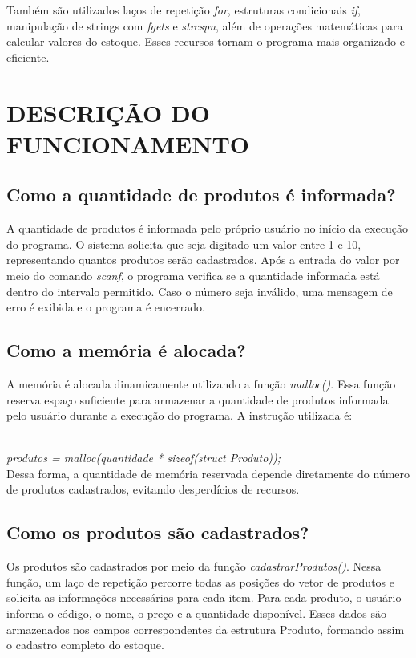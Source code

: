 \documentclass[12pt, a4paper, brazil]{article}
\begin{document}
Também são utilizados laços de repetição \textit{for}, estruturas condicionais \textit{if}, manipulação de strings com \textit{fgets} e \textit{strcspn}, além de operações matemáticas para calcular valores do estoque. Esses recursos tornam o programa mais organizado e eficiente.

\section{DESCRIÇÃO DO FUNCIONAMENTO}
\subsection{Como a quantidade de produtos é informada?}

A quantidade de produtos é informada pelo próprio usuário no início da execução do programa. O sistema solicita que seja digitado um valor entre 1 e 10, representando quantos produtos serão cadastrados.
Após a entrada do valor por meio do comando \textit{scanf}, o programa verifica se a quantidade informada está dentro do intervalo permitido. Caso o número seja inválido, uma mensagem de erro é exibida e o programa é encerrado.

\subsection{Como a memória é alocada?}

A memória é alocada dinamicamente utilizando a função \textit{malloc()}. Essa função reserva espaço suficiente para armazenar a quantidade de produtos informada pelo usuário durante a execução do programa. A instrução utilizada é:

\textit{\\produtos = malloc(quantidade * sizeof(struct Produto));}\\

Dessa forma, a quantidade de memória reservada depende diretamente do número de produtos cadastrados, evitando desperdícios de recursos.

\subsection{Como os produtos são cadastrados?}
Os produtos são cadastrados por meio da função \textit{cadastrarProdutos()}. Nessa função, um laço de repetição percorre todas as posições do vetor de produtos e solicita as informações necessárias para cada item.
Para cada produto, o usuário informa o código, o nome, o preço e a quantidade disponível. Esses dados são armazenados nos campos correspondentes da estrutura Produto, formando assim o cadastro completo do estoque.
\end{document}

